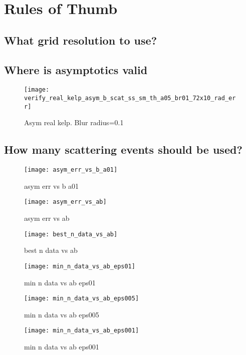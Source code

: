 \section{Rules of Thumb}
\subsection{What grid resolution to use?}
\subsection{Where is asymptotics valid}

\begin{figure}[H]
  \centering
  \texttt{[image: verify\_real\_kelp\_asym\_b\_scat\_ss\_sm\_th\_a05\_br01\_72x10\_rad\_err]}
  \caption{Asym real kelp. Blur radius=0.1}
  \label{fig:asym_real_kelp_br01}
\end{figure}


\subsection{How many scattering events should be used?}
\begin{figure}[H]
  \centering
  \texttt{[image: asym\_err\_vs\_b\_a01]}
  \caption{asym err vs b a01}
  \label{fig:asym_err_vs_b_a01}
\end{figure}

\begin{figure}[H]
  \centering
  \texttt{[image: asym\_err\_vs\_ab]}
  \caption{asym err vs ab}
  \label{fig:asym_err_vs_ab}
\end{figure}

\begin{figure}[H]
  \centering
  \texttt{[image: best\_n\_data\_vs\_ab]}
  \caption{best n data vs ab}
  \label{fig:best_n_data_vs_ab}
\end{figure}

\begin{figure}[H]
  \centering
  \texttt{[image: min\_n\_data\_vs\_ab\_eps01]}
  \caption{min n data vs ab eps01}
  \label{fig:min_n_data_vs_ab_eps01}
\end{figure}

\begin{figure}[H]
  \centering
  \texttt{[image: min\_n\_data\_vs\_ab\_eps005]}
  \caption{min n data vs ab eps005}
  \label{fig:min_n_data_vs_ab_eps005}
\end{figure}

\begin{figure}[H]
  \centering
  \texttt{[image: min\_n\_data\_vs\_ab\_eps001]}
  \caption{min n data vs ab eps001}
  \label{fig:min_n_data_vs_ab_eps001}
\end{figure}

